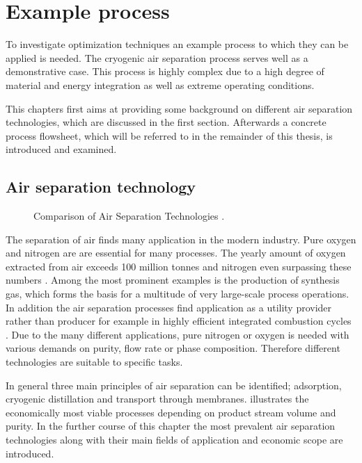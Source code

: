 \chapter{Example process}
\label{chp:airsep}

    To investigate optimization techniques an example process to which they can be applied is needed.
    The cryogenic air separation process serves well as a demonstrative case. This process is highly 
    complex due to a high degree of material and energy integration as well as extreme operating conditions. 
    
    This chapters first aims at providing some background on different air separation technologies, which are 
    discussed in the first section. Afterwards a concrete process flowsheet, which will be referred to in the 
    remainder of this thesis, is introduced and examined. 
    
    \section{Air separation technology}
    \begin{figure}[h]
    	
    	\caption{Comparison of Air Separation Technologies \cite{Prasad.1994}.}
    	\label{fig:tech_compar}
    \end{figure}
    The separation of air finds many application in the modern industry. Pure oxygen and nitrogen are
    are essential for many processes. The yearly amount of oxygen extracted from air exceeds 100 million
    tonnes and nitrogen even surpassing these numbers \cite{Emsley.2003c2001}. Among the most prominent
    examples is the production of synthesis gas,
    which forms the basis for a multitude of very large-scale process operations. In addition the
    air separation processes find application as a utility provider rather than producer
    for example in highly efficient integrated combustion cycles \cite{Mahapatra.2010}. Due to the
    many different applications, pure nitrogen or oxygen is needed with various demands on
    purity, flow rate or phase composition. Therefore different technologies are suitable to specific tasks.

    In general three main principles of air separation can be identified; adsorption,
    cryogenic distillation and transport through membranes.  illustrates the
    economically most viable processes depending on product stream volume and purity.
    In the further course of this chapter the most prevalent  air separation technologies
    along with their main fields of application and economic scope are introduced.

